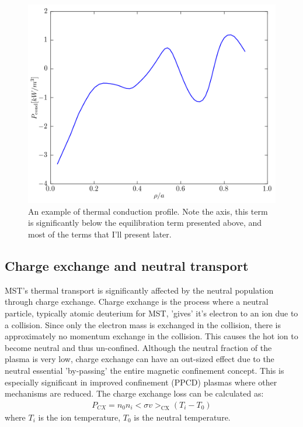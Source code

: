 \begin{refsection}
\begin{figure}[!htb]
	\centering
	\includegraphics[width = 0.75\linewidth]{./transport_modeling/p_cond.png}
    \caption[Thermal conduction profile]{An example of thermal conduction profile. Note the axis, this term is significantly below the equilibration term presented above, and most of the terms that I'll present later.}
    \label{fig:p_cond}
\end{figure}%

\subsection{Charge exchange and neutral transport}\label{sec:neutral_physics}

MST's thermal transport is significantly affected by the neutral population through charge exchange. Charge exchange is the process where a neutral particle, typically atomic deuterium for MST, 'gives' it's electron to an ion due to a collision. Since only the electron mass is exchanged in the collision, there is approximately no momentum exchange in the collision.
This causes the hot ion to become neutral and thus un-confined. Although the neutral fraction of the plasma is very low, charge exchange can have an out-sized effect due to the neutral essential 'by-passing' the entire magnetic confinement concept. 
This is especially significant in improved confinement (PPCD) plasmas where other mechanisms are reduced. The charge exchange loss can be calculated as:
\begin{align}
    P_{CX} = n_0 n_i <\sigma v>_\text{CX} (T_i - T_0)
\end{align}
where $T_i$ is the ion temperature, $T_{0}$ is the neutral temperature.


\end{refsection}
